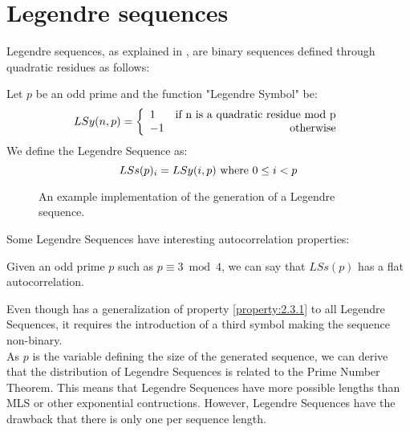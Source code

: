 \section{Legendre sequences}

Legendre sequences, as explained in \citet{legendre_sequences}, are binary
sequences defined through quadratic residues as follows:

\begin{definition}
  Let $p$ be an odd prime and the function "Legendre Symbol" be:
    \begin{equation}
      LSy(n, p) = \left\{\begin{array}{lr}
          1  & \textnormal{if n is a quadratic residue mod p}   \\
          -1 & \textnormal{otherwise} \\
      \end{array}\right.
    \end{equation}
  We define the Legendre Sequence as:
    \begin{equation}
      LSs(p)_{i} = LSy(i, p) \textnormal{  where  } 0 \leq i < p
    \end{equation}
\end{definition}

\begin{figure}[ht!]
  \caption{An example implementation of the generation of a Legendre sequence.}
  \label{}
\end{figure}

Some Legendre Sequences have interesting autocorrelation properties:
\begin{property}\label{property:2.3.1}
  Given an odd prime $p$ such as $p \equiv 3 \bmod 4$, we can say that
  $LSs(p)$ has a flat autocorrelation.\cite{legendre_sequences}
\end{property}

Even though \citet{legendre_sequences} has a generalization of property
\ref{property:2.3.1} to all Legendre Sequences, it requires the introduction of
a third symbol making the sequence non-binary. \\

As $p$ is the variable defining the size of the generated sequence, we can
derive that the distribution of Legendre Sequences is related to the Prime
Number Theorem. This means that Legendre Sequences have more possible lengths
than MLS or other exponential contructions. However, Legendre Sequences have
the drawback that there is only one per sequence length.
